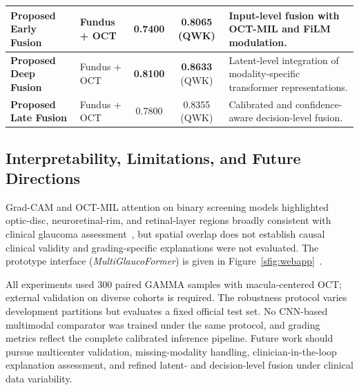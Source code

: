 \documentclass{ieeeaccess}
\begin{document}
\begin{table}[!t]
{\begin{tabular}{|p{}|p{}|c|c|p{}|}
            \textbf{Proposed Early Fusion}                     &
            Fundus + OCT                                       &
            0.7400                                             &
            0.8065 (QWK)                                       &
            Input-level fusion with OCT-MIL and FiLM modulation.                               \\
            \hline
            \textbf{Proposed Deep Fusion}                      &
            Fundus + OCT                                       &
            \textbf{0.8100}                                    &
            \textbf{0.8633} (QWK)                              &
            Latent-level integration of modality-specific transformer representations.         \\
            \hline
            \textbf{Proposed Late Fusion}                      &
            Fundus + OCT                                       &
            0.7800                                             &
            0.8355 (QWK)                                       &
            Calibrated and confidence-aware decision-level fusion.                             \\
            \hline
        \end{tabular}}
\end{table}


\subsection{Interpretability, Limitations, and Future Directions}
\label{subsec:interpretability_discussion}

Grad-CAM and OCT-MIL attention on binary screening models highlighted optic-disc, neuroretinal-rim, and retinal-layer regions broadly consistent with clinical glaucoma assessment~\cite{kanski10}, but spatial overlap does not establish causal clinical validity and grading-specific explanations were not evaluated. The prototype interface (\textit{MultiGlaucoFormer}) is given in Figure~\ref{sfig:webapp}~\cite{multiglaucoformer_webapp}.

All experiments used 300 paired GAMMA samples with macula-centered OCT; external validation on diverse cohorts is required. The robustness protocol varies development partitions but evaluates a fixed official test set. No CNN-based multimodal comparator was trained under the same protocol, and grading metrics reflect the complete calibrated inference pipeline. Future work should pursue multicenter validation, missing-modality handling, clinician-in-the-loop explanation assessment, and refined latent- and decision-level fusion under clinical data variability.
\end{document}
